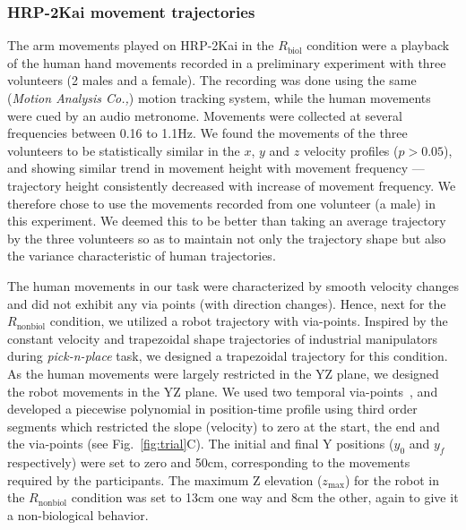 \documentclass[a4paper, 12pt, oneside]{Thesis}  %
\begin{document}
\subsubsection{HRP-2Kai movement trajectories} \label{hrpTraj}

The arm movements played on HRP-2Kai in the $R_{\text{biol}}$ condition were a playback of the human hand movements recorded in a preliminary experiment with three volunteers (2 males and a female). The recording was done using the same ({\it Motion Analysis Co.,}) motion tracking system, while the human movements were cued by an audio metronome. Movements were collected at several frequencies between 0.16 to 1.1Hz. We found the movements of the three volunteers to be statistically similar in the $x$, $y$ and $z$ velocity profiles ($p > 0.05$), and showing similar trend in movement height with movement frequency ---trajectory height consistently decreased with increase of movement frequency. We therefore chose to use the movements recorded from one volunteer (a male) in this experiment. We deemed this to be better than taking an average trajectory by the three volunteers so as to maintain not only the trajectory shape but also the variance characteristic of human trajectories.                                

The human movements in our task were characterized by smooth velocity changes and did not exhibit any via points (with direction changes). Hence, next for the $R_{\text{nonbiol}}$ condition, we utilized a robot trajectory with via-points. Inspired by the constant velocity and trapezoidal shape trajectories of industrial manipulators during {\it pick-n-place} task, we designed a trapezoidal trajectory for this condition. As the human movements were largely restricted in the YZ plane, we designed the robot movements in the YZ plane. We used two temporal via-points~\cite{Biagiotti:Springer:2008}, and developed a piecewise polynomial in position-time profile using third order segments which restricted the slope (velocity) to zero at the start, the end and the via-points (see Fig.~\ref{fig:trial}C). The initial  and final Y positions ($y_0$ and $y_f$ respectively) were set to zero and 50cm, corresponding to the movements required by the participants. The maximum Z elevation ($z_{\max}$) for the robot in the $R_{\text{nonbiol}}$ condition was set to 13cm one way and 8cm the other, again to give it a non-biological behavior. 



\end{document}
